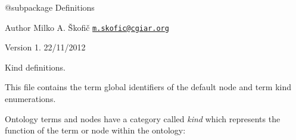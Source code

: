 \begin{DoxyVerb} @subpackage        Definitions
\end{DoxyVerb}


\begin{DoxyAuthor}{Author}
Milko A. Škofič \href{mailto:m.skofic@cgiar.org}{\tt m.\-skofic@cgiar.\-org} 
\end{DoxyAuthor}
\begin{DoxyVersion}{Version}
1. 22/11/2012
\end{DoxyVersion}
Kind definitions.

This file contains the term global identifiers of the default node and term kind enumerations.

Ontology terms and nodes have a category called {\itshape kind} which represents the function of the term or node within the ontology\-:


